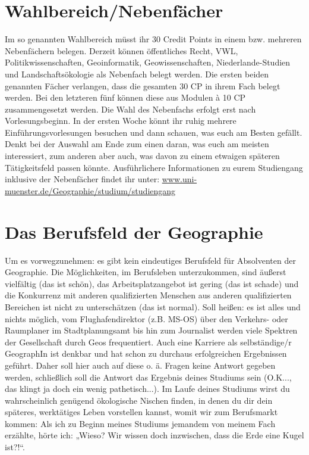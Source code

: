 \section*{Wahlbereich/Nebenfächer}
Im so genannten Wahlbereich müsst ihr 30 Credit Points in einem bzw. mehreren Nebenfächern belegen. Derzeit können öffentliches Recht, VWL, Politikwissenschaften, Geoinformatik, Geowissenschaften, Niederlande-Studien und Landschaftsökologie als Nebenfach belegt werden. Die ersten beiden genannten Fächer verlangen, dass die gesamten 30 CP in ihrem Fach belegt werden. Bei den letzteren fünf können diese aus Modulen à 10 CP zusammengesetzt werden. Die Wahl des Nebenfachs erfolgt erst nach Vorlesungsbeginn. In der ersten Woche könnt ihr ruhig mehrere Einführungsvorlesungen besuchen und dann schauen, was euch am Besten gefällt. Denkt bei der Auswahl am Ende zum einen daran, was euch am meisten interessiert, zum anderen aber auch, was davon zu einem etwaigen späteren Tätigkeitsfeld passen könnte. Ausführlichere Informationen zu eurem Studiengang inklusive der Nebenfächer ﬁndet ihr unter: \url{www.uni-muenster.de/Geographie/studium/studiengang}

\section*{Das Berufsfeld der Geographie}
Um es vorwegzunehmen: es gibt kein eindeutiges Berufsfeld für Absolventen der Geographie. Die Möglichkeiten, im Berufsleben unterzukommen, sind äußerst vielfältig (das ist schön), das Arbeitsplatzangebot ist gering (das ist schade) und die Konkurrenz mit anderen qualifizierten Menschen aus anderen qualifizierten Bereichen ist nicht zu unterschätzen (das ist normal). Soll heißen: es ist alles und nichts möglich, vom Flughafendirektor (z.B. MS-OS) über den Verkehrs- oder Raumplaner im Stadtplanungsamt bis hin zum Journalist werden viele Spektren der Gesellschaft durch Geos frequentiert. Auch eine Karriere als selbständige/r GeographIn ist denkbar und hat schon zu durchaus erfolgreichen Ergebnissen geführt. Daher soll hier auch auf diese o. ä. Fragen keine Antwort gegeben werden, schließlich soll die Antwort das Ergebnis deines Studiums sein (O.K..., das klingt ja doch ein wenig pathetisch...). Im Laufe deines Studiums wirst du wahrscheinlich genügend ökologische Nischen ﬁnden, in denen du dir dein späteres, werktätiges Leben vorstellen kannst, womit wir zum Berufsmarkt kommen: Als ich zu Beginn meines Studiums jemandem von meinem Fach erzählte, hörte ich: „Wieso? Wir wissen doch inzwischen, dass die Erde eine Kugel ist?!“.

